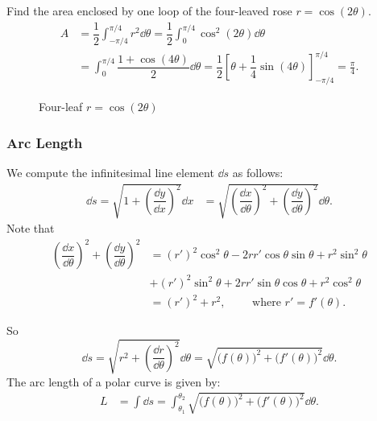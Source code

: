 \begin{ex}
    Find the area enclosed by one loop of the four-leaved rose $r = \cos(2\theta)$.
    \begin{align*}
        A &= \dfrac{1}{2} \int_{-\pi/4}^{\pi/4} r^2 \dd \theta = \dfrac{1}{2} \int_{0}^{\pi/4} \cos^2(2\theta) \dd \theta \tag{Integrand is an even function}\\
        &= \int_{0}^{\pi/4} \dfrac{1 + \cos(4\theta)}{2} \dd \theta = \dfrac{1}{2} \left[\theta + \dfrac{1}{4}\sin(4\theta)\right]_{-\pi/4}^{\pi/4} = \frac{\pi}{4}.
    \end{align*}

    \begin{figure}[H]
        \centering
        \resizebox{0.5\textwidth}{!}{} %
        \caption{Four-leaf $r=\cos (2\theta)$}
        \label{fig:four-leaf}
    \end{figure}
\end{ex}


\subsubsection{Arc Length}
We compute the infinitesimal line element $\dd s$ as follows:
\begin{align*}
    \dd s = \sqrt{1 + \left(\dfrac{\dd y}{\dd x}\right)^2} \dd x &= \sqrt{\left(\dfrac{\dd x}{\dd \theta}\right)^2 + \left(\dfrac{\dd y}{\dd \theta}\right)^2} \dd \theta.
\end{align*}
Note that 
\begin{align*}
    \left(\dfrac{\dd x}{\dd \theta}\right)^2 + \left(\dfrac{\dd y}{\dd \theta}\right)^2 &= (r')^2 \cos^2\theta - 2rr'\cos\theta \sin\theta + r^2 \sin^2\theta \\
    &+ (r')^2 \sin^2\theta + 2rr'\sin\theta \cos\theta + r^2 \cos^2\theta\\
    &= (r')^2 + r^2, \qquad \text{ where } r' = f'(\theta).
\end{align*}

So 
\[\dd s = \sqrt{r^2 + \left(\dfrac{\dd r}{\dd \theta}\right)^2} \dd \theta = \sqrt{\Big(f(\theta)\Big)^2 + \Big(f'(\theta)\Big)^2} \dd \theta.\]
The arc length of a polar curve is given by:
\begin{align*}
    L &= \int \dd s= \int_{\theta_1}^{\theta_2} \sqrt{\Big(f(\theta)\Big)^2 + \Big(f'(\theta)\Big)^2} \dd \theta.
\end{align*}


